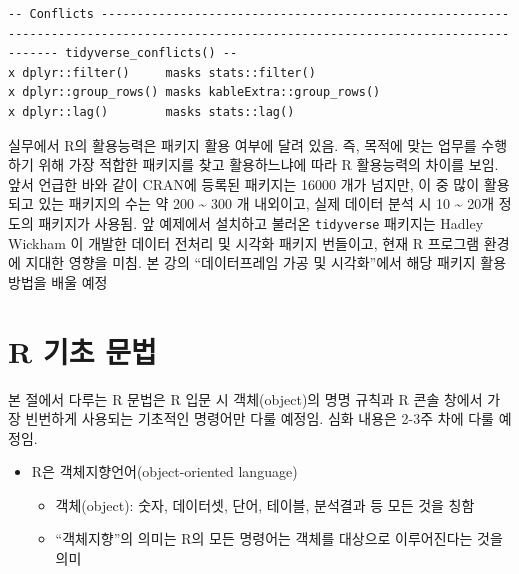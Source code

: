 \documentclass[
  11pt,
]{krantz}
\providecommand{\tightlist}{%
  \setlength{\itemsep}{0pt}\setlength{\parskip}{0pt}}
\let\BeginKnitrBlock\begin \let\EndKnitrBlock\end
\begin{document}
\begin{verbatim}
-- Conflicts -------------------------------------------------------------------------------------------------------------------------------------- tidyverse_conflicts() --
x dplyr::filter()     masks stats::filter()
x dplyr::group_rows() masks kableExtra::group_rows()
x dplyr::lag()        masks stats::lag()
\end{verbatim}

\normalsize

\footnotesize

\BeginKnitrBlock{rmdnote}
실무에서 R의 활용능력은 패키지 활용 여부에 달려 있음. 즉, 목적에 맞는 업무를 수행하기 위해 가장 적합한 패키지를 찾고 활용하느냐에 따라 R 활용능력의 차이를 보임. 앞서 언급한 바와 같이 CRAN에 등록된 패키지는 16000 개가 넘지만, 이 중 많이 활용되고 있는 패키지의 수는 약 200 \textasciitilde{} 300 개 내외이고, 실제 데이터 분석 시 10 \textasciitilde{} 20개 정도의 패키지가 사용됨. 앞 예제에서 설치하고 불러온 \texttt{tidyverse} 패키지는 Hadley Wickham \citep{tidyverse2019}이 개발한 데이터 전처리 및 시각화 패키지 번들이고, 현재 R 프로그램 환경에 지대한 영향을 미침. 본 강의 ``데이터프레임 가공 및 시각화''에서 해당 패키지 활용 방법을 배울 예정
\EndKnitrBlock{rmdnote}

\normalsize

\hypertarget{r-basic}{%
\section{R 기초 문법}\label{r-basic}}

\footnotesize

\BeginKnitrBlock{rmdnote}
본 절에서 다루는 R 문법은 R 입문 시 객체(object)의 명명 규칙과 R 콘솔 창에서 가장 빈번하게 사용되는 기초적인 명령어만 다룰 예정임. 심화 내용은 2-3주 차에 다룰 예정임.
\EndKnitrBlock{rmdnote}

\normalsize

\begin{itemize}
\tightlist
\item
  R은 객체지향언어(object-oriented language)

  \begin{itemize}
  \tightlist
  \item
    객체(object): 숫자, 데이터셋, 단어, 테이블, 분석결과 등 모든 것을 칭함
  \item
    ``객체지향''의 의미는 R의 모든 명령어는 객체를 대상으로 이루어진다는 것을 의미
  \end{itemize}
\end{itemize}
\end{document}
